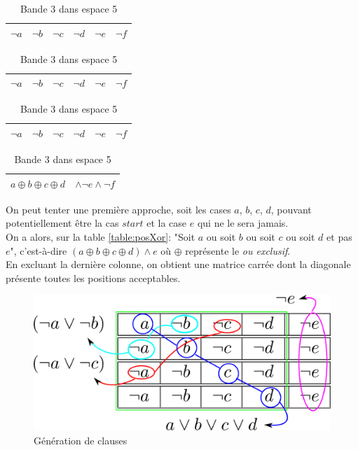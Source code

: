 \documentclass[a4paper,12pt]{report}
\newcommand\black{\cellcolor{black}}
\newcommand\grey{\cellcolor{black!50}}
\begin{document}
\begin{table}[H]
\begin{subtable}[B]{0.5\textwidth}
			\begin{tabular}{|c|c|c|c||c|c|}
			\hline 
			$\lnot a$ & \grey \color{gray}$\lnot$\color{white}$b$ & \black \color{white}$\lnot c$ &
			\black \color{white}$\lnot d$  & $\lnot e$ & $\lnot f$\\ 
			\hline
			\end{tabular}
			
			\begin{tabular}{|c|c|c|c||c|c|}
			\hline 
			$\lnot a$ & $\lnot b$ &\grey \color{gray}$\lnot$\color{white}$c$ & 
			\black \color{white}$\lnot d$ &\black \color{white}$\lnot e$  & $\lnot f$\\ 
			\hline
			\end{tabular}

			\begin{tabular}{|c|c|c|c||c|c|}
			\hline 
			$\lnot a$ & $\lnot b$ & $\lnot c$  &\grey \color{gray}$\lnot$\color{white}$d$ & 
			\black \color{white}$\lnot e$ &\black \color{white}$\lnot f$  \\ 
			\hline
			\end{tabular}

			\begin{tabular}{|c c c c c c|}
			\hline 
			\multicolumn{4}{|c||}{$a \oplus b \oplus c \oplus d$} & \multicolumn{2}{c|}{$\wedge \lnot e \wedge \lnot f$} \\ 
			\hline
			\end{tabular}			
			
        \caption{Bande 3 dans espace 5}
        \label{table:tailleE}
    \end{subtable}
\end{table}

On peut tenter une première approche, soit les cases $a$, $b$, $c$, $d$, pouvant potentiellement être la cas $start$ et la case $e$ qui ne le sera jamais. \\
On a alors, sur la table \ref{table:posXor}: "Soit $a$ ou soit $b$ ou soit $c$ ou soit $d$ et pas $e$", c'est-à-dire $(a \oplus b \oplus c \oplus d) \wedge e$ où $\oplus$ représente le \textit{ou exclusif}.\\

En excluant la dernière colonne, on obtient une matrice carrée dont la diagonale présente toutes les positions acceptables. \\
\begin{figure}[H]
\centering
\includegraphics[scale=0.3]{generationFNC.png}
\caption{Génération de clauses}
\label{fig:generationFNC}
\end{figure}
\end{document}
